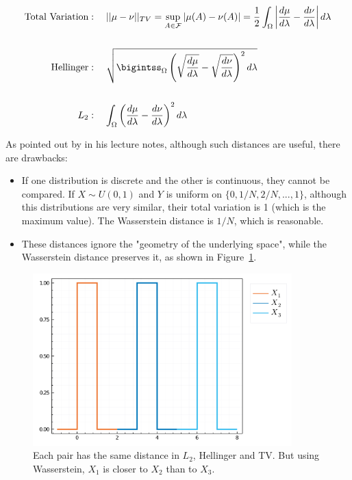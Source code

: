 \documentclass[10pt]{article}
\begin{document}
\begin{align*} 
\text{Total Variation} &: \quad || \mu - \nu ||_{TV} =
\sup_{A \in \mathcal F} |\mu (A) - \nu(A)| = 
\frac{1}{2}\int_\Omega \left | \frac{d\mu}{d\lambda} - \frac{d\nu}{d\lambda} \right
|d\lambda \\
\\
\text{Hellinger} &: \quad \sqrt{\bigintss_\Omega \left(\sqrt{\frac{d\mu}{d\lambda}} -
\sqrt{\frac{d\nu}{d\lambda}} \right )^2d\lambda} \\
\\
L_2 &: \quad \int_\Omega \left(\frac{d\mu}{d\lambda} - \frac{d\nu}{d\lambda}\right)^2
d\lambda \\
\end{align*}

As pointed out by \citet{wassermanStatisicalMethods2018} in his lecture notes,
although such distances are useful, there are drawbacks:
\begin{itemize}
	\item If one distribution is discrete and the other is continuous,  they cannot
	be compared. If $X \sim U(0,1)$ and $Y$ is uniform on $\{0,1/N, 2/N,...,1\}$,
	although this distributions are very similar, their total variation is 1 (which is
	the maximum value). The Wasserstein distance is $1/N$, which is reasonable.
	\item These distances ignore the "geometry of the underlying space", while the
	Wasserstein distance preserves it, as shown in Figure~\ref{fig:distances}.
\end{itemize}
\begin{figure}[h]
	\centering
	\includegraphics[width=10cm]{images/Distributions_Distances.png}
    \caption{Each pair has the same distance in $L_2$, Hellinger and TV. But using
    Wasserstein, $X_1$ is closer to $X_2$ than to $X_3$.}
    \label{fig:distances}
\end{figure}
\end{document}
